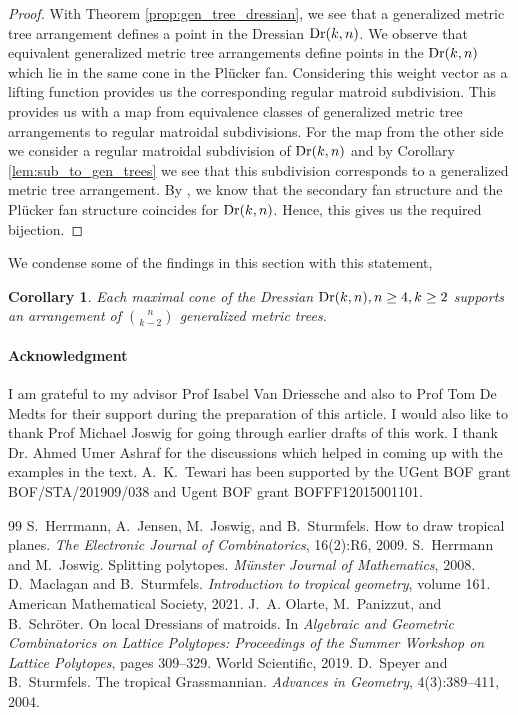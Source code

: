 \documentclass[10pt,a4paper]{amsart}
\DeclareMathOperator{\Dr}{\rm Dr}
\theoremstyle{plain}
\newtheorem{corollary}[theorem]{Corollary}
\theoremstyle{definition}
\numberwithin{subcase}{case}
\begin{document}
\begin{proof}
With Theorem \ref{prop:gen_tree_dressian}, we see that a generalized metric tree arrangement defines a point in the Dressian $\Dr(k,n)$. We observe that equivalent generalized metric tree arrangements define points in the $\Dr(k,n)$ which lie in the same cone in the Pl\"ucker fan. Considering this weight vector as a lifting function provides us the corresponding regular matroid subdivision. This provides us with a map from equivalence classes of generalized metric tree arrangements to regular matroidal subdivisions. For the map from the other side we consider a regular matroidal subdivision of $\Dr(k,n)$ and by Corollary \ref{lem:sub_to_gen_trees} we see that this subdivision corresponds to a generalized metric tree arrangement. By \cite{olarte2019local}, we know that the secondary fan structure and the Pl\"ucker fan structure coincides for $\Dr(k,n)$. Hence, this gives us the required bijection.
\end{proof}

\setcounter{theorem}{28}
We condense some of the findings in this section with this statement,

\begin{corollary}\label{cor:final}
Each maximal cone of the Dressian $\Dr(k,n), n \geq 4, k \geq 2$ supports an arrangement of $\binom{n}{k-2}$ generalized metric trees.
\end{corollary}

\paragraph{\bf Acknowledgment} I am grateful to my advisor Prof Isabel Van Driessche and also to Prof Tom De Medts for their support during the preparation of this article. I would also like to thank Prof Michael Joswig for going through earlier drafts of this work. I thank Dr. Ahmed Umer Ashraf for the discussions which helped in coming up with the examples in the text. A.~K.~Tewari has been supported by the UGent BOF grant BOF/STA/201909/038 and Ugent BOF grant BOFFF12015001101.

\begin{thebibliography}{99}
 S.~Herrmann, A.~Jensen, M.~Joswig, and B.~Sturmfels. How to draw tropical planes. {\em The Electronic Journal of Combinatorics}, 16(2):R6, 2009.
 S.~Herrmann and M.~Joswig. Splitting polytopes. {\em M{\"u}nster Journal of Mathematics}, 2008.
 D.~Maclagan and B.~Sturmfels. {\em Introduction to tropical geometry}, volume 161. American Mathematical Society, 2021.
 J.~A. Olarte, M.~Panizzut, and B.~Schr{\"o}ter. On local {D}ressians of matroids. In {\em Algebraic and Geometric Combinatorics on Lattice Polytopes: Proceedings of the Summer Workshop on Lattice Polytopes}, pages 309--329. World Scientific, 2019.
 D.~Speyer and B.~Sturmfels. The tropical {G}rassmannian. {\em Advances in Geometry}, 4(3):389--411, 2004.
\end{thebibliography}
\end{document}
